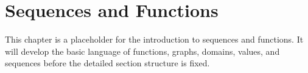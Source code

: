 \chapter{Sequences and Functions}

This chapter is a placeholder for the introduction to sequences and functions. It will develop the basic language of functions, graphs, domains, values, and sequences before the detailed section structure is fixed.
